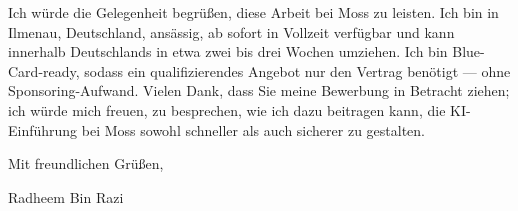 \documentclass[11pt,a4paper]{coverletter}
\begin{document}
Ich würde die Gelegenheit begrüßen, diese Arbeit bei Moss zu leisten. Ich bin in Ilmenau, Deutschland, ansässig, ab sofort in Vollzeit verfügbar und kann innerhalb Deutschlands in etwa zwei bis drei Wochen umziehen. Ich bin Blue-Card-ready, sodass ein qualifizierendes Angebot nur den Vertrag benötigt — ohne Sponsoring-Aufwand. Vielen Dank, dass Sie meine Bewerbung in Betracht ziehen; ich würde mich freuen, zu besprechen, wie ich dazu beitragen kann, die KI-Einführung bei Moss sowohl schneller als auch sicherer zu gestalten.

\closing{Mit freundlichen Grüßen,}{Radheem Bin Razi}
\end{document}
